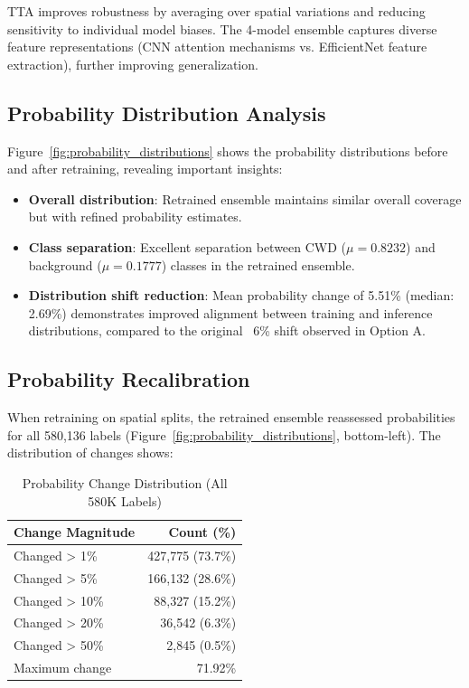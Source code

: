 TTA improves robustness by averaging over spatial variations and reducing sensitivity to
individual model biases. The 4-model ensemble captures diverse feature representations
(CNN attention mechanisms vs. EfficientNet feature extraction), further improving generalization.

\subsection{Probability Distribution Analysis}

Figure~\ref{fig:probability_distributions} shows the probability distributions before and
after retraining, revealing important insights:

\begin{itemize}
    \item \textbf{Overall distribution}: Retrained ensemble maintains similar overall coverage
          but with refined probability estimates.

    \item \textbf{Class separation}: Excellent separation between CWD ($\mu = 0.8232$) and
          background ($\mu = 0.1777$) classes in the retrained ensemble.

    \item \textbf{Distribution shift reduction}: Mean probability change of 5.51\% (median: 2.69\%)
          demonstrates improved alignment between training and inference distributions, compared to
          the original ~6\% shift observed in Option A.
\end{itemize}

\subsection{Probability Recalibration}

When retraining on spatial splits, the retrained ensemble reassessed probabilities for all
580,136 labels (Figure~\ref{fig:probability_distributions}, bottom-left). The distribution of
changes shows:

\begin{table}[h!]
\centering
\caption{Probability Change Distribution (All 580K Labels)}
\label{tab:prob_changes}
\begin{tabular}{lr}
\hline
Change Magnitude & Count (\%) \\
\hline
Changed > 1\% & 427,775 (73.7\%) \\
Changed > 5\% & 166,132 (28.6\%) \\
Changed > 10\% & 88,327 (15.2\%) \\
Changed > 20\% & 36,542 (6.3\%) \\
Changed > 50\% & 2,845 (0.5\%) \\
Maximum change & 71.92\% \\
\hline
\end{tabular}
\end{table}

